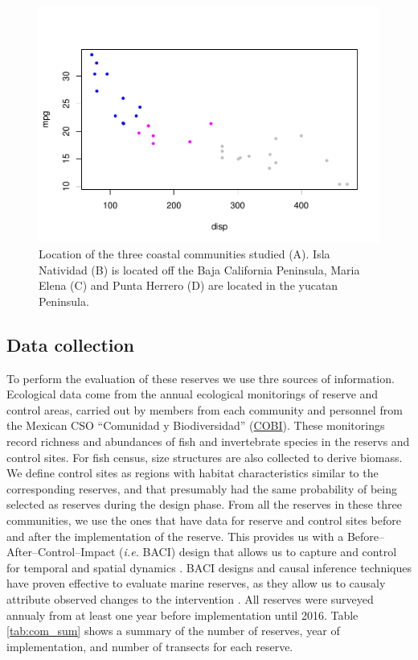 \documentclass{frontiersSCNS}
\theoremstyle{definition}
\theoremstyle{definition}
\theoremstyle{definition}
\theoremstyle{remark}
\begin{document}
\begin{figure}
\centering
\includegraphics{Villasenor-Derbez_files/figure-latex/unnamed-chunk-1-1.pdf}
\caption{\label{fig:unnamed-chunk-1}\label{fig:map}Location of the three
coastal communities studied (A). Isla Natividad (B) is located off the
Baja California Peninsula, Maria Elena (C) and Punta Herrero (D) are
located in the yucatan Peninsula.}
\end{figure}

\subsection{Data collection}\label{data-collection}

To perform the evaluation of these reserves we use thre sources of
information. Ecological data come from the annual ecological monitorings
of reserve and control areas, carried out by members from each community
and personnel from the Mexican CSO ``Comunidad y Biodiversidad''
(\href{www.cobi.org.mx}{COBI}). These monitorings record richness and
abundances of fish and invertebrate species in the reservs and control
sites. For fish census, size structures are also collected to derive
biomass. We define control sites as regions with habitat characteristics
similar to the corresponding reserves, and that presumably had the same
probability of being selected as reserves during the design phase. From
all the reserves in these three communities, we use the ones that have
data for reserve and control sites before and after the implementation
of the reserve. This provides us with a Before--After--Control--Impact
(\emph{i.e.} BACI) design that allows us to capture and control for
temporal and spatial dynamics \citep{depalma_2018,ferraro_2006-oW}. BACI
designs and causal inference techniques have proven effective to
evaluate marine reserves, as they allow us to causaly attribute observed
changes to the intervention
\citep{moland_2013-VP,Villasenor-Derbez_2018}. All reserves were
surveyed annualy from at least one year before implementation until
2016. Table \ref{tab:com_sum} shows a summary of the number of reserves,
year of implementation, and number of transects for each reserve.
\end{document}
